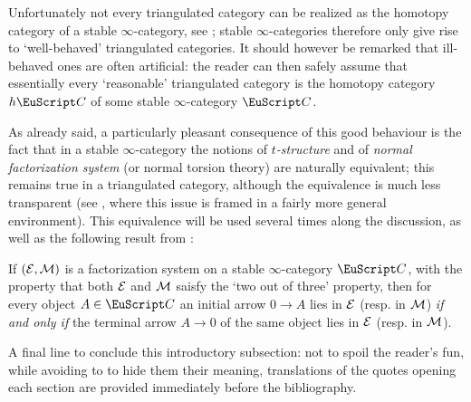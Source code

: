 {Unfortunately not every triangulated category can be realized as the homotopy category of a stable $\infty$-category, see \cite{MR2342636}; stable $\infty$-categories therefore only give rise to `well\hyp{}behaved' triangulated categories. It should however be remarked that ill\hyp{}behaved ones are often artificial: the reader can then safely assume that essentially every `reasonable' triangulated category is the homotopy category $h\C$ of some stable $\infty$-category $\C$.

As already said, a particularly pleasant consequence of this good behaviour is the fact that in a stable $\infty$-category the notions of \emph{$t$-structure} \cite{BBDPervers} and of %
\emph{normal factorization system} (or normal torsion theory) \cite{CHK} are naturally equivalent; this remains true in a triangulated category, although the equivalence is much less transparent (see \cite{tderiv}, where this issue is framed in a fairly more general environment). This equivalence will be used several times along the discussion, as well as 
the following result from \cite{FL0}:
\begin{lemma*}
If $(\mathcal{E},\mathcal{M})$ is a factorization system on a stable $\infty$-category $\C$, with the property that both $\mathcal{E}$ and $\mathcal{M}$ saisfy the `two out of three' property, then for every object $A\in\C$ an initial arrow $0\to A$ lies in $\mathcal{E}$ (resp. in $\mathcal{M}$) \emph{if and only if} the terminal arrow $A\to 0$ of the same object lies in $\mathcal{E}$ (resp. in $\mathcal{M}$).
\end{lemma*}
A final line to conclude this introductory subsection: not to spoil the reader's fun, while avoiding to to hide them their meaning, translations of the quotes opening each section are provided immediately before the bibliography.
}
